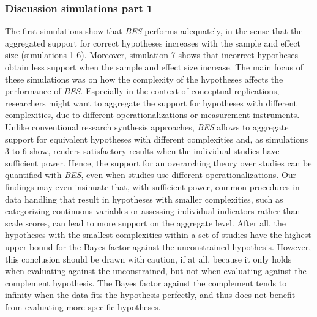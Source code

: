 \documentclass[
]{interact}
\begin{document}
                    \hypertarget{discussion-simulations-part-1}{%
                      \subsubsection{Discussion simulations part
                        1}\label{discussion-simulations-part-1}}
                    
                    The first simulations show that \emph{BES} performs adequately, in the
                    sense that the aggregated support for correct hypotheses increases with
                    the sample and effect size (simulations 1-6). Moreover, simulation 7
                    shows that incorrect hypotheses obtain less support when the sample and
                    effect size increase. The main focus of these simulations was on how the
                    complexity of the hypotheses affects the performance of \emph{BES}.
                    Especially in the context of conceptual replications, researchers might
                    want to aggregate the support for hypotheses with different
                    complexities, due to different operationalizations or measurement
                    instruments. Unlike conventional research synthesis approaches,
                    \emph{BES} allows to aggregate support for equivalent hypotheses with
                    different complexities and, as simulations 3 to 6 show, renders
                    satisfactory results when the individual studies have sufficient power.
                    Hence, the support for an overarching theory over studies can be
                    quantified with \emph{BES}, even when studies use different
                    operationalizations. Our findings may even insinuate that, with
                    sufficient power, common procedures in data handling that result in
                    hypotheses with smaller complexities, such as categorizing continuous
                    variables or assessing individual indicators rather than scale scores,
                    can lead to more support on the aggregate level. After all, the
                    hypotheses with the smallest complexities within a set of studies have
                    the highest upper bound for the Bayes factor against the unconstrained
                    hypothesis. However, this conclusion should be drawn with caution, if at
                    all, because it only holds when evaluating against the unconstrained,
                    but not when evaluating against the complement hypothesis. The Bayes
                    factor against the complement tends to infinity when the data fits the
                    hypothesis perfectly, and thus does not benefit from evaluating more
                    specific hypotheses.
                    
\end{document}
